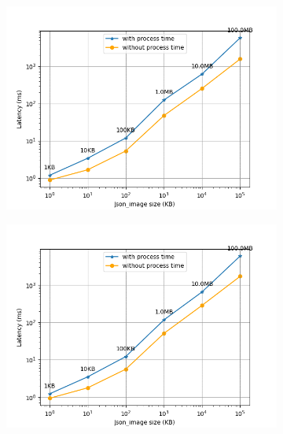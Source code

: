 \begin{figure}[htb]
        \centering
    \begin{subfigure}{0.49\textwidth}
        \includegraphics[width=\textwidth]{figures/tests/proportional_tests/log_Average_json_image_messages_sending_time_of_100_tests_1KB_to_100MB.png}\hfill 
        \caption{} \label{fig: proportional-imagesize-c}
    \end{subfigure}
    \begin{subfigure}{0.49\textwidth}
        \centering
        \includegraphics[width=\textwidth]{figures/tests/proportional_tests/log_Average_json_image_messages_receiving_time_of_100_tests_1KB_to_100MB.png}\hfill 
        \caption{} \label{fig: proportional-imagesize-d}

\end{subfigure}
\end{figure}
